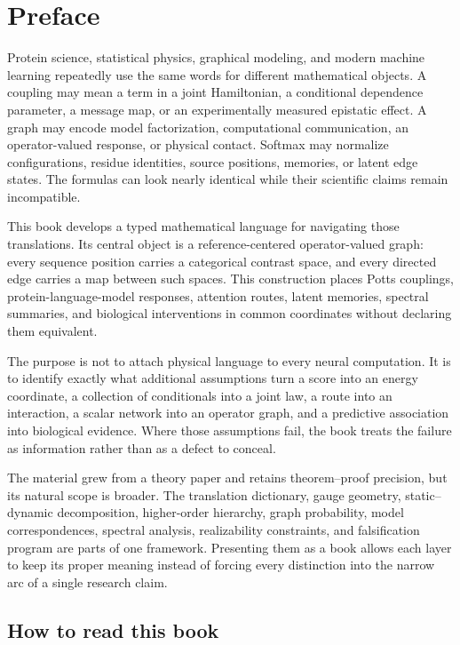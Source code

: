 \chapter*{Preface}

Protein science, statistical physics, graphical modeling, and modern machine learning repeatedly
use the same words for different mathematical objects.  A coupling may mean a term in a joint
Hamiltonian, a conditional dependence parameter, a message map, or an experimentally measured
epistatic effect.  A graph may encode model factorization, computational communication, an
operator-valued response, or physical contact.  Softmax may normalize configurations, residue
identities, source positions, memories, or latent edge states.  The formulas can look nearly
identical while their scientific claims remain incompatible.

This book develops a typed mathematical language for navigating those translations.  Its central
object is a reference-centered operator-valued graph: every sequence position carries a categorical
contrast space, and every directed edge carries a map between such spaces.  This construction
places Potts couplings, protein-language-model responses, attention routes, latent memories,
spectral summaries, and biological interventions in common coordinates without declaring them
equivalent.

The purpose is not to attach physical language to every neural computation.  It is to identify
exactly what additional assumptions turn a score into an energy coordinate, a collection of
conditionals into a joint law, a route into an interaction, a scalar network into an operator
graph, and a predictive association into biological evidence.  Where those assumptions fail, the
book treats the failure as information rather than as a defect to conceal.

The material grew from a theory paper and retains theorem--proof precision, but its natural scope
is broader.  The translation dictionary, gauge geometry, static--dynamic decomposition,
higher-order hierarchy, graph probability, model correspondences, spectral analysis,
realizability constraints, and falsification program are parts of one framework.  Presenting them
as a book allows each layer to keep its proper meaning instead of forcing every distinction into
the narrow arc of a single research claim.

\section*{How to read this book}

